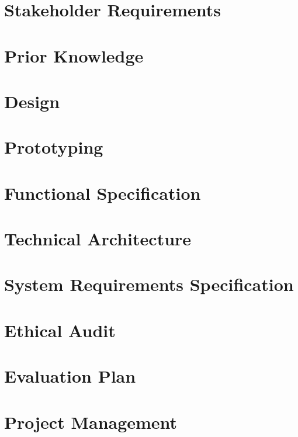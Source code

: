 \documentclass[12pt]{report}
\begin{document}
\chapter{Stakeholder Requirements}


\chapter{Prior Knowledge}


\chapter{Design}


\chapter{Prototyping}


\chapter{Functional Specification}


\chapter{Technical Architecture}


\chapter{System Requirements Specification}


\chapter{Ethical Audit}


\chapter{Evaluation Plan}


\chapter{Project Management}

\end{document}
